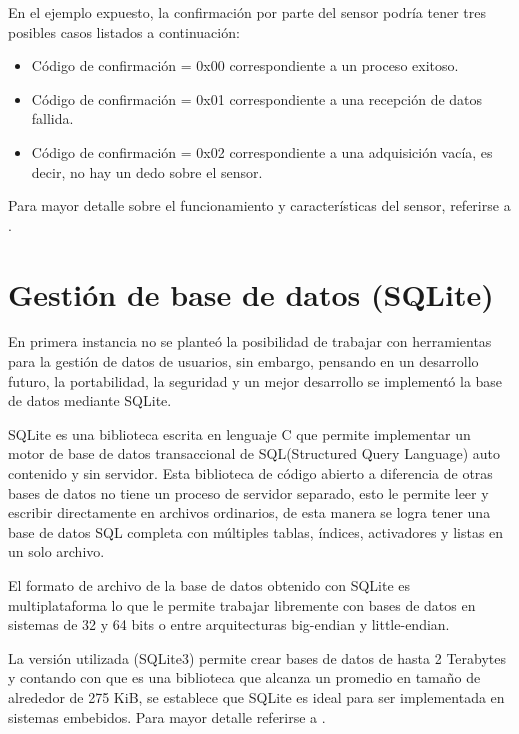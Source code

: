 En el ejemplo expuesto, la confirmación por parte del sensor podría tener tres posibles casos listados a continuación:

\begin{itemize}
\item Código de confirmación = 0x00 correspondiente a un proceso exitoso. 
\item Código de confirmación = 0x01 correspondiente a una recepción de datos fallida. 
\item Código de confirmación = 0x02 correspondiente a una adquisición vacía, es decir, no hay un dedo sobre el sensor.
\end{itemize}
Para mayor detalle sobre el funcionamiento y características del sensor, referirse a \citep{FINGER}.
\section{Gestión de base de datos (SQLite)}
En primera instancia no se planteó la posibilidad de trabajar con herramientas para la gestión de datos de usuarios, sin embargo, pensando en un desarrollo futuro, la portabilidad, la seguridad y un mejor desarrollo se implementó la base de datos mediante SQLite.

SQLite es una biblioteca escrita en lenguaje C que permite implementar un motor de base de datos transaccional de SQL(Structured Query Language) auto contenido y sin servidor. Esta biblioteca de código abierto a diferencia de otras bases de datos no tiene un proceso de servidor separado, esto le permite leer y escribir directamente en archivos ordinarios, de esta manera se logra tener una base de datos SQL  completa con múltiples tablas, índices, activadores y listas en un solo archivo.

El formato de archivo de la base de datos obtenido con SQLite es multiplataforma lo que le permite trabajar libremente con bases de datos en sistemas de 32 y 64 bits o entre arquitecturas big-endian y little-endian. 

La versión utilizada (SQLite3) permite crear bases de  datos de hasta 2 Terabytes y contando con que es una biblioteca que alcanza un promedio en tamaño de alrededor de 275 KiB, se establece que SQLite es ideal para ser implementada en sistemas embebidos. Para mayor detalle referirse a \citep{SQLITE}.
